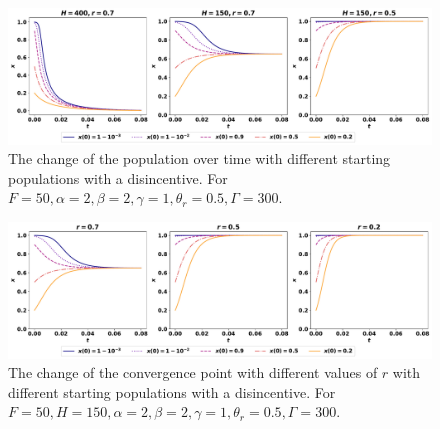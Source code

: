 \documentclass[10pt]{article}
\begin{document}
\begin{figure}[!htbp]
    \includegraphics[width=\textwidth]{images/ESS-new-utility.pdf}
    \caption{The change of the population over 
    time with different starting populations with a disincentive. For \(F=50, \alpha=2,
    \beta=2, \gamma=1, \theta_r=0.5, \Gamma=300\).}
    \label{fig:ess-new-utility}
\end{figure}

\begin{figure}[!htbp]
    \includegraphics[width=\textwidth]{images/ESS-new-utility-based-r.pdf}
    \caption{The change of the convergence point with different values of \(r\)
    with different starting populations with a disincentive. For \(F=50, H=150,
    \alpha=2, \beta=2, \gamma=1, \theta_r=0.5, \Gamma=300\).}
    \label{fig:convergence-over-r}
\end{figure}
\end{document}
